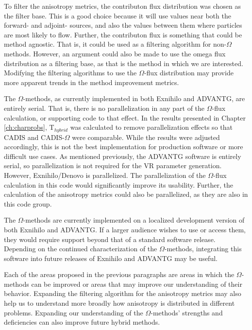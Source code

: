 To filter the anisotropy metrics, the contributon flux distribution was chosen
as the filter base. This is a good choice because it will use values near both
the forward- and adjoint- sources, and also the values between them where
particles are most likely to flow. Further, the contributon flux is something
that could be method agnostic. That is, it could be used as a filtering
algorithm for non-$\Omega$ methods. However, an argument could also be made to
use the omega flux distribution as a filtering base, as that is the method in
which we are interested. Modifying the filtering algorithms to use the
$\Omega$-flux distribution may provide more apparent trends in the method
improvement metrics.

The $\Omega$-methods, as currently implemented in both Exnihilo and ADVANTG, are
entirely serial. That is, there is no parallelization in any part of the
$\Omega$-flux calculation, or supporting code to that effect. In the results
presented in Chapter \ref{ch:charprobs}, T$_{hybrid}$ was calculated to remove
parallelization effects so that CADIS and CADIS-$\Omega$ were comparable. While
the results were adjusted accordingly, this is not the best implementation for
production software or more difficult use cases. As mentioned previously, the
ADVANTG software is entirely serial, so parallelization is not required for the
VR parameter generation. However, Exnihilo/Denovo is parallelized. The
parallelization of the $\Omega$-flux calculation in this code
would significantly improve its
usability. Further, the calculation of the anisotropy metrics could also be
parallelized, as they are also in this code group.

The $\Omega$-methods are currently implemented on a localized
development version of both Exnihilo and ADVANTG. If a larger audience wishes to
use or access them, they would require support beyond that of a standard
software release. Depending on the continued characterization of the
$\Omega$-methods, integrating this software into future releases of Exnihilo and
ADVANTG may be useful.

Each of the areas proposed in the previous paragraphs are areas in which the
$\Omega$-methods can be improved or areas that may improve our understanding of
their behavior. Expanding the filtering algorithm for the anisotropy metrics may
also help us to understand more broadly how anisotropy is distributed in
different problems. Expanding our understanding of the $\Omega$-methods'
strengths and deficiencies can also improve future hybrid methods.


